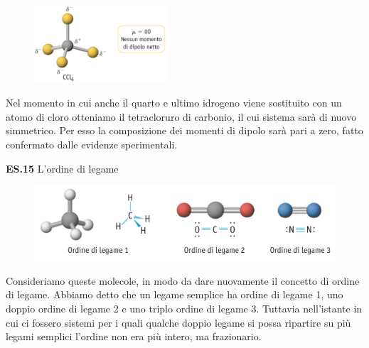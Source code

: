 \hspace{0.5cm}\begin{minipage}{0.2\textwidth}
\begin{figure}[H]
\includegraphics[width=5cm]{immagini/CCl_4.png}
\end{figure}
\end{minipage} \hfill
\begin{minipage}{0.5\textwidth}
Nel momento in cui anche il quarto e ultimo idrogeno viene sostituito con un atomo di cloro otteniamo il tetracloruro di carbonio, il cui sistema sarà di nuovo simmetrico. Per esso la composizione dei momenti di dipolo sarà pari a zero, fatto confermato dalle evidenze sperimentali.
\end{minipage}

\vspace{0.2cm}\textbf{ES.15} L'ordine di legame
\begin{figure}[htp]
    \centering
    \includegraphics[width=14cm]{immagini/ordine-di-legame.png}
\end{figure}

Consideriamo queste molecole, in modo da dare nuovamente il concetto di ordine di legame. Abbiamo detto che un legame semplice ha ordine di legame 1, uno doppio ordine di legame 2 e uno triplo ordine di legame 3. Tuttavia nell'istante in cui ci fossero sistemi per i quali qualche doppio legame si possa ripartire su più legami semplici l'ordine non era più intero, ma frazionario.


